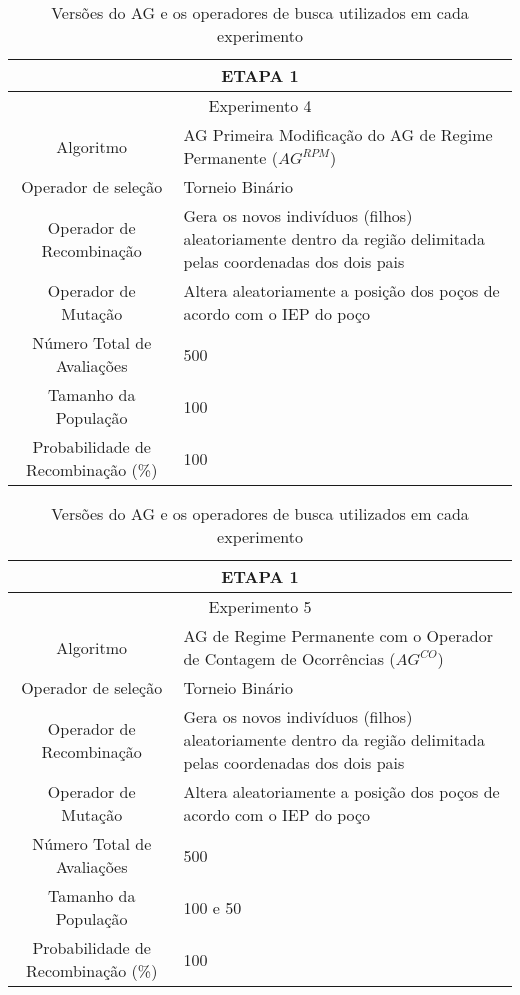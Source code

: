 \documentclass[12pt,a4paper]{report}
\begin{document}
 \begin{table}[H]
\centering
\caption{Versões do AG e os operadores de busca utilizados em cada experimento}

\begin{tabular}{|c|p{10cm}|}
 \hline
  \multicolumn{2}{|c|}{ETAPA 1} \\ \hline
  \multicolumn{2}{|c|}{Experimento 4} \\ \hline
{Algoritmo} & AG Primeira Modificação do AG de Regime Permanente ($AG^{RPM}$) \\ \hline
 Operador de seleção & Torneio Binário \\ \hline
 Operador de Recombinação & Gera os novos indivíduos (filhos) aleatoriamente dentro da região delimitada pelas coordenadas dos dois pais \\  \hline
 Operador de Mutação & Altera aleatoriamente a posição dos poços de acordo com o IEP do poço \\ \hline
 Número Total de Avaliações & 500 \\ \hline
 Tamanho da População & 100 \\ \hline
 Probabilidade de Recombinação (\%) & 100 \\ \hline
 
 
 
\end{tabular}
\end{table} 
 
 \begin{table}[H]
\centering
\caption{Versões do AG e os operadores de busca utilizados em cada experimento}

\begin{tabular}{|c|p{10cm}|}
 \hline
  \multicolumn{2}{|c|}{ETAPA 1} \\ \hline
  \multicolumn{2}{|c|}{Experimento 5} \\ \hline
{Algoritmo} &AG de Regime Permanente com o Operador de Contagem de Ocorrências ($AG^{CO}$) \\ \hline
 Operador de seleção & Torneio Binário \\ \hline
 Operador de Recombinação & Gera os novos indivíduos (filhos) aleatoriamente dentro da região delimitada pelas coordenadas dos dois pais \\  \hline
 Operador de Mutação & Altera aleatoriamente a posição dos poços de acordo com o IEP do poço \\ \hline
 Número Total de Avaliações & 500 \\ \hline
 Tamanho da População & 100 e 50 \\ \hline
 Probabilidade de Recombinação (\%) & 100 \\ \hline
 
 
\end{tabular}
\end{table} 
 
\end{document}
